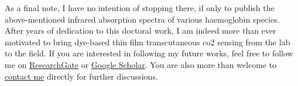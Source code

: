 As a final note, I have no intention of stopping there, if only to publish the above-mentioned infrared absorption spectra of various haemoglobin species. After years of dedication to this doctoral work, I am indeed more than ever motivated to bring dye-based thin film transcutaneous \gls{co2} sensing from the lab to the field. If you are interested in following my future works, feel free to follow me on \href{http://web.archive.org/web/20241009063754/https://www.researchgate.net/profile/Emmanuel-Dervieux-2}{ResearchGate} or \href{https://web.archive.org/web/20241009063905/https://scholar.google.fr/citations?user=DCR_h9YAAAAJ&hl=fr}{Google Scholar}. You are also more than welcome to \href{mailto:emmanuel.dervieux@gmail.com}{contact me} directly for further discussions.